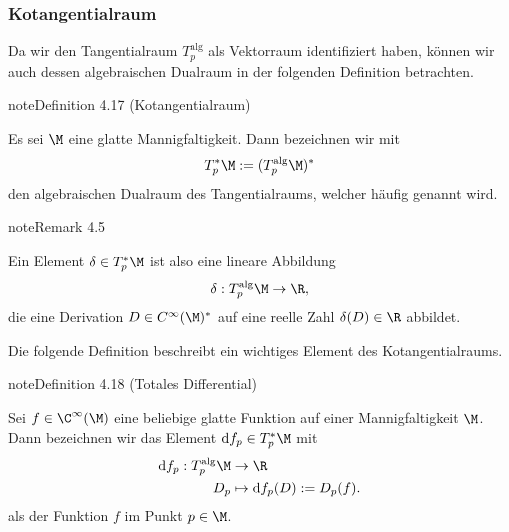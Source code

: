 \documentclass[letterpaper,10pt,german]{jupyterBook}
\begin{document}
\subsubsection{Kotangentialraum}
\label{\detokenize{manifolds/tangential:kotangentialraum}}
\sphinxAtStartPar
Da wir den Tangentialraum \(T^{\text{alg}}_p\) als Vektorraum identifiziert haben, können wir auch dessen algebraischen Dualraum in der folgenden Definition betrachten.
\label{manifolds/tangential:definition-15}
\begin{sphinxadmonition}{note}{Definition 4.17 (Kotangentialraum)}



\sphinxAtStartPar
Es sei \(\M\) eine glatte Mannigfaltigkeit.
Dann bezeichnen wir mit
\begin{equation*}
\begin{split}T_p^\ast\M:= (T_p^{\text{alg}}\M)^\ast\end{split}
\end{equation*}
\sphinxAtStartPar
den algebraischen Dualraum des Tangentialraums, welcher häufig  genannt wird.
\end{sphinxadmonition}
\label{manifolds/tangential:remark-16}
\begin{sphinxadmonition}{note}{Remark 4.5}



\sphinxAtStartPar
Ein Element \(\delta\in T_p^\ast\M\) ist also eine lineare Abbildung
\begin{equation*}
\begin{split}\delta: T_p^{\text{alg}}\M \to \R,\end{split}
\end{equation*}
\sphinxAtStartPar
die eine Derivation \(D\in C^\infty(\M)^\ast\) auf eine reelle Zahl \(\delta(D)\in\R\) abbildet.
\end{sphinxadmonition}

\sphinxAtStartPar
Die folgende Definition beschreibt ein wichtiges Element des Kotangentialraums.
\label{manifolds/tangential:def:totdiff}
\begin{sphinxadmonition}{note}{Definition 4.18 (Totales Differential)}



\sphinxAtStartPar
Sei \(f\in\C^\infty(\M)\) eine beliebige glatte Funktion auf einer Mannigfaltigkeit \(\M\).
Dann bezeichnen wir das Element \(\mathrm{d}f_p \in T_p^\ast\M\) mit
\begin{equation*}
\begin{split}\mathrm{d}f_p: T_p^{\text{alg}}\M &\to\R\\
D_p &\mapsto \mathrm{d}f_p(D):= D_p(f).\end{split}
\end{equation*}
\sphinxAtStartPar
als  der Funktion \(f\) im Punkt \(p \in \M\).
\end{sphinxadmonition}
\end{document}
